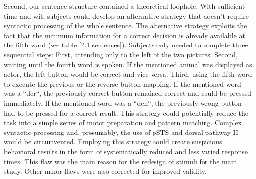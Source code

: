 Second, our sentence structure contained a theoretical loophole.
With sufficient time and wit, subjects could develop an alternative strategy that doesn't require syntactic processing of the whole sentence.
The alternative strategy exploits the fact that the minimum information for a correct decision is already available at the fifth word (see table \ref{2.1.sentences}).
Subjects only needed to complete three sequential steps:
First, attending only to the left of the two pictures.
Second, waiting until the fourth word is spoken.
If the mentioned animal was displayed as actor, the left button would be correct and vice versa.
Third, using the fifth word to execute the previous or the reverse button mapping.
If the mentioned word was a ``der``, the previously correct button remained correct and could be pressed immediately.
If the mentioned word was a ``den``, the previously wrong button had to be pressed for a correct result.
This strategy could potentially reduce the task into a simple series of motor preparation and pattern matching.
Complex syntactic processing and, presumably, the use of pSTS and dorsal pathway II would be circumvented.
Employing this strategy could create suspicious behavioral results in the form of systematically reduced and less varied response times.
This flaw was the main reason for the redesign of stimuli for the main study.
Other minor flaws were also corrected for improved validity.
